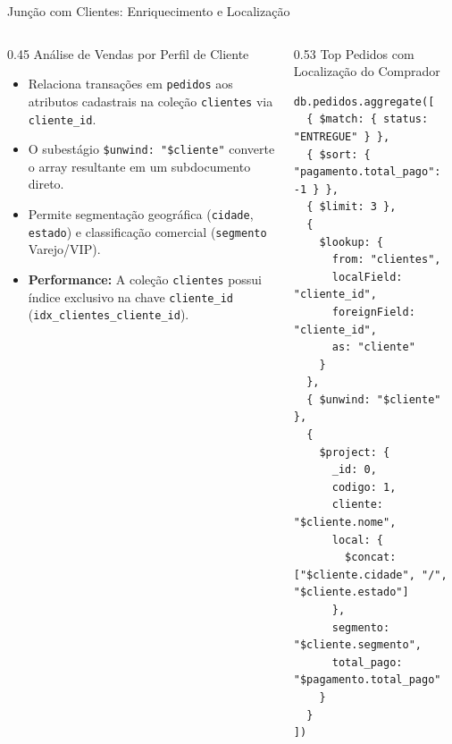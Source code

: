 \begin{frame}[fragile]{Junção com Clientes: Enriquecimento e Localização}
  \vspace{-0.5cm}
  \begin{columns}[t,onlytextwidth]
    \begin{column}{0.45\textwidth}
      \alert{Análise de Vendas por Perfil de Cliente}\par
      \footnotesize
      \begin{itemize}
        \item Relaciona transações em \texttt{pedidos} aos atributos cadastrais na coleção \texttt{clientes} via \lstinline[language=mongosh, basicstyle=\footnotesize\ttfamily]|cliente_id|.
        \item O subestágio \lstinline[language=mongosh, basicstyle=\footnotesize\ttfamily]|$unwind: "$cliente"| converte o array resultante em um subdocumento direto.
        \item Permite segmentação geográfica (\texttt{cidade}, \texttt{estado}) e classificação comercial (\texttt{segmento} Varejo/VIP).
        \item \textbf{Performance:} A coleção \texttt{clientes} possui índice exclusivo na chave \lstinline[language=mongosh, basicstyle=\footnotesize\ttfamily]|cliente_id| (\texttt{idx\_clientes\_cliente\_id}).
      \end{itemize}
    \end{column}
    \begin{column}{0.53\textwidth}
      \alert{Top Pedidos com Localização do Comprador}\par
      \vspace{0.05cm}
      \begin{lstlisting}[language=mongosh, basicstyle=\fontsize{6.2pt}{6.9pt}\ttfamily]
db.pedidos.aggregate([
  { $match: { status: "ENTREGUE" } },
  { $sort: { "pagamento.total_pago": -1 } },
  { $limit: 3 },
  {
    $lookup: {
      from: "clientes",
      localField: "cliente_id",
      foreignField: "cliente_id",
      as: "cliente"
    }
  },
  { $unwind: "$cliente" },
  {
    $project: {
      _id: 0,
      codigo: 1,
      cliente: "$cliente.nome",
      local: {
        $concat: ["$cliente.cidade", "/", "$cliente.estado"]
      },
      segmento: "$cliente.segmento",
      total_pago: "$pagamento.total_pago"
    }
  }
])
      \end{lstlisting}
    \end{column}
  \end{columns}
\end{frame}

